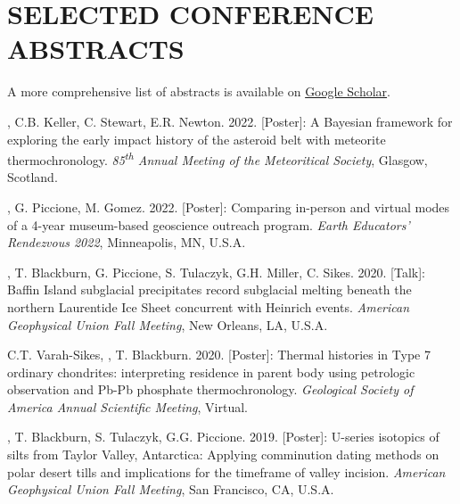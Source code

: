 \section*{SELECTED CONFERENCE ABSTRACTS}

\begin{center} 
A more comprehensive list of abstracts is available on \href{https://scholar.google.com/citations?user=KHLOvgcAAAAJ&hl=en}{Google Scholar}. 
\end{center}

\begin{etaremune} [itemsep=4pt, leftmargin=3ex]

 \item \ghedwards, C.B. Keller, C. Stewart, E.R. Newton. 2022. [Poster]: A Bayesian framework for exploring the early impact history of the asteroid belt with meteorite thermochronology. \textit{85\textsuperscript{th} Annual Meeting of the Meteoritical Society}, Glasgow, Scotland. 
 
  \item \ghedwards, G. Piccione, M. Gomez. 2022. [Poster]: Comparing in-person and virtual modes of a 4-year museum-based geoscience outreach program. \textit{Earth Educators' Rendezvous 2022}, Minneapolis, MN, U.S.A.
  
  \item \ghedwards, T. Blackburn, G. Piccione, S. Tulaczyk, G.H. Miller, C. Sikes. 2020. [Talk]: Baffin Island subglacial precipitates record subglacial melting beneath the northern Laurentide Ice Sheet concurrent with Heinrich events. \textit{American Geophysical Union Fall Meeting}, New Orleans, LA, U.S.A.
  
  \item C.T. Varah-Sikes, \ghedwards, T. Blackburn. 2020. [Poster]: Thermal histories in Type 7 ordinary chondrites: interpreting residence in parent body using petrologic observation and Pb-Pb phosphate thermochronology. \textit{Geological Society of America Annual Scientific Meeting}, Virtual.
  
  \item \ghedwards, T. Blackburn, S. Tulaczyk, G.G. Piccione. 2019. [Poster]: U-series isotopics of silts from Taylor Valley, Antarctica: Applying comminution dating methods on polar desert tills and implications for the timeframe of valley incision. \textit{American Geophysical Union Fall Meeting}, San Francisco, CA, U.S.A.
  

\end{etaremune}
